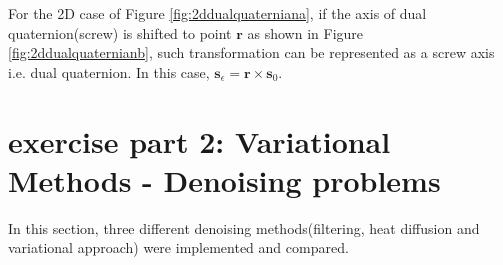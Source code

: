\documentclass[paper=a4, fontsize=11pt]{scrartcl} %
\numberwithin{equation}{section} %
\numberwithin{figure}{section} %
\numberwithin{table}{section} %
\renewcommand{\vec}[1]{\mathbf{#1}}
\begin{document}
\begin{itemize}
	For the 2D case of Figure \ref{fig:2ddualquaterniana}, if the axis of dual quaternion(screw) is shifted to point $\vec{r}$ as shown in Figure \ref{fig:2ddualquaternianb}, such transformation can be represented as a screw axis i.e. dual quaternion. In this case, $\vec{s}_\epsilon = \vec{r} \times \vec{s}_0$. \cite{kavan2008geometric}
	
\end{itemize}

\pagebreak


\section{exercise part 2: Variational Methods - Denoising problems}

In this section, three different denoising methods(filtering, heat diffusion and variational approach) were implemented and compared.
\end{document}
